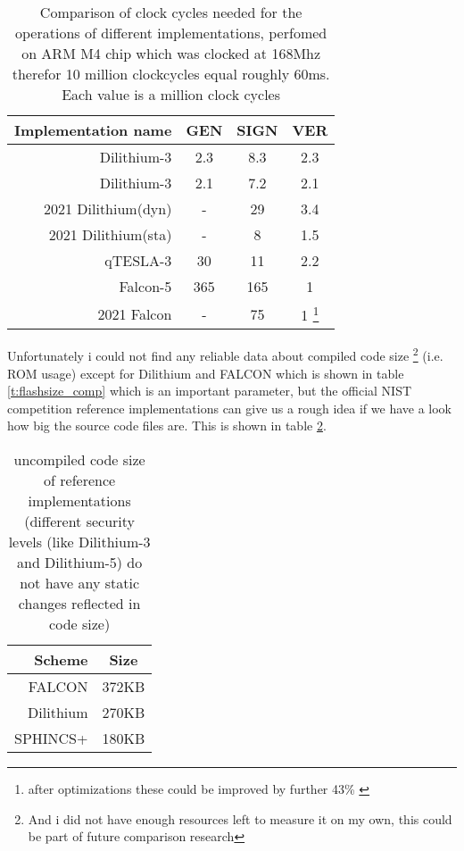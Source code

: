 \documentclass[conference]{IEEEtran}
\begin{document}
\begin{table}%
    \caption{Comparison of clock cycles needed for the operations of different implementations, perfomed on ARM M4 chip which was clocked at 168Mhz therefor 10 million clockcycles equal roughly 60ms. Each value is a million clock cycles}
    \label{t:clockcycles_comp}
    \centering\begin{tabular}{| r | c c c |}
        \hline
        Implementation name                     & GEN           & SIGN         & VER \\
        \hline
        Dilithium-3 \cite{QR_Iot_Lattice}       & 2.3           & 8.3          & 2.3 \\
        Dilithium-3 \cite{Energy_comp}          & 2.1           & 7.2          & 2.1 \\ %
        2021 Dilithium(dyn)\cite{update_sign}   & -             & 29           & 3.4\\
        2021 Dilithium(sta)\cite{update_sign}   & -             & 8            & 1.5\\
        qTESLA-3 \cite{QR_Iot_Lattice}          & 30            & 11           & 2.2\\
        Falcon-5 \cite{QR_Iot_Lattice}          & 365           & 165          & 1\\
        2021 Falcon  \cite{update_sign}         & -             & 75           & 1 \footnote{after optimizations these could be improved by further 43\% \cite{falcon_micro_impl}}\\
        \hline
    \end{tabular}
    
\end{table}


Unfortunately i could not find any reliable data about compiled code size \footnote{And i did not have enough resources left to measure it on my own, this could be part of future comparison research} (i.e. ROM usage) except for Dilithium and FALCON which is shown in table \ref{t:flashsize_comp} which is an important parameter, but the official NIST competition reference implementations \cite{nist_finalists_website} can give us a rough idea if we have a look how big the source code files are. This is shown in table \ref{t:codesize_comp}.

\begin{table}%
    \caption{uncompiled code size of reference implementations (different security levels (like Dilithium-3 and Dilithium-5) do not have any static changes reflected in code size)}
    \label{t:codesize_comp}
    \centering\begin{tabular}{| r | c |}
        \hline
        Scheme & Size\\
        \hline
        FALCON & 372KB \\
        Dilithium & 270KB\\
        SPHINCS+ & 180KB\\

        \hline
    \end{tabular}
\end{table}
\end{document}
